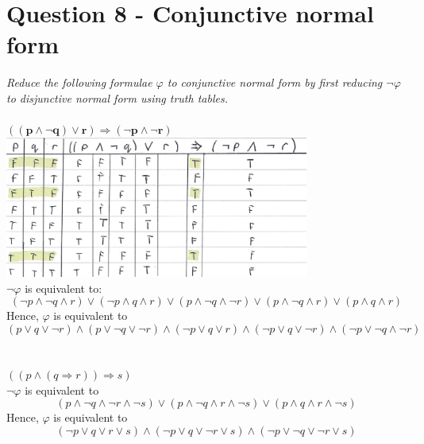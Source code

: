 \documentclass{article}[18pt]
\begin{document}
\section{Question 8 - Conjunctive normal form}
\textit{Reduce the following formulae $\varphi$ to conjunctive normal form by first reducing $\lnot \varphi$ to disjunctive normal form using truth tables.}\\
\\
$\mathbf{((p\land\lnot q)\lor r)\Rightarrow (\lnot p \land \lnot r)}$\\
\includegraphics[width=10cm]{Truth_Table.png}
\\
$\lnot \varphi$ is equivalent to:
$$(\lnot p\land\lnot q\land r)\lor(\lnot p\land q\land r)\lor (p\land\lnot q\land\lnot r)\lor(p\land\lnot q\land r)\lor (p\land q\land r)$$
Hence, $\varphi$ is equivalent to
$$(p\lor q\lor \lnot r)\land( p\lor \lnot q\lor \lnot r)\land (\lnot p\lor q\lor r)\land(\lnot p\lor q\lor\lnot r)\land (\lnot p\lor\lnot q\land \lnot r)$$
\\
\\
$((p\land (q\Rightarrow r))\Rightarrow s)$\\
$\lnot \varphi$ is equivalent to
$$(p\land\lnot q\land\lnot r\land\lnot s)\lor (p\land\lnot q\land r\land\lnot s)\lor (p\land q\land r\land\lnot s)$$
Hence, $\varphi$ is equivalent to
$$(\lnot p\lor q\lor r\lor s)\land (\lnot p\lor q\lor \lnot r\lor s)\land (\lnot p\lor \lnot q \lor\lnot r \lor s)$$
\end{document}
